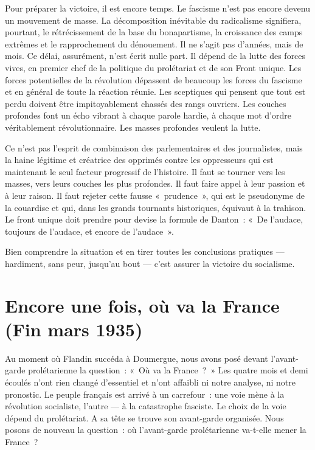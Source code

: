 \documentclass[french,twoside]{book} %
\begin{document}
Pour préparer la victoire, il est encore temps. Le fascisme n’est pas encore devenu un mouvement de masse. La décomposition inévitable du radicalisme signifiera, pourtant, le rétrécissement de la base du bonapartisme, la croissance des camps extrêmes et le rapprochement du dénouement. Il ne s’agit pas d’années, mais de mois. Ce délai, assurément, n’est écrit nulle part. Il dépend de la lutte des forces vives, en premier chef de la politique du prolétariat et de son Front unique. Les forces potentielles de la révolution dépassent de beaucoup les forces du fascisme et en général de toute la réaction réunie. Les sceptiques qui pensent que tout est perdu doivent être  impitoyablement chassés des rangs ouvriers. Les couches profondes font un écho vibrant à chaque parole hardie, à chaque mot d’ordre véritablement révolutionnaire. Les masses profondes veulent la lutte.\par
Ce n’est pas l’esprit de combinaison des parlementaires et des journalistes, mais la haine légitime et créatrice des opprimés contre les oppresseurs qui est maintenant le seul facteur progressif de l’histoire. Il faut se tourner vers les masses, vers leurs couches les plus profondes. Il faut faire appel à leur passion et à leur raison. Il faut rejeter cette fausse « prudence », qui est le pseudonyme de la couardise et qui, dans les grands tournants historiques, équivaut à la trahison. Le front unique doit prendre pour devise la formule de Danton : « De l’audace, toujours de l’audace, et encore de l’audace ».\par
Bien comprendre la situation et en tirer toutes les conclusions pratiques — hardiment, sans peur, jusqu’au bout — c’est assurer la victoire du socialisme.
 \section[{Encore une fois, où va la France. (Fin mars 1935)}]{Encore une fois, où va la France \\
(Fin mars 1935)}
\label{p3}\renewcommand{\leftmark}{Encore une fois, où va la France \\
(Fin mars 1935)}

\noindent Au moment où Flandin succéda à Doumergue, nous avons posé devant l’avant-garde prolétarienne la question : « Où va la France ? » Les quatre mois et demi écoulés n’ont rien changé d’essentiel et n’ont affaibli ni notre analyse, ni notre pronostic. Le peuple français est arrivé à un carrefour : une voie mène à la révolution socialiste, l’autre — à la catastrophe fasciste. Le choix de la voie dépend du prolétariat. A sa tête se trouve son avant-garde organisée. Nous posons de nouveau la question : où l’avant-garde prolétarienne va-t-elle mener la France ?\par
\end{document}
